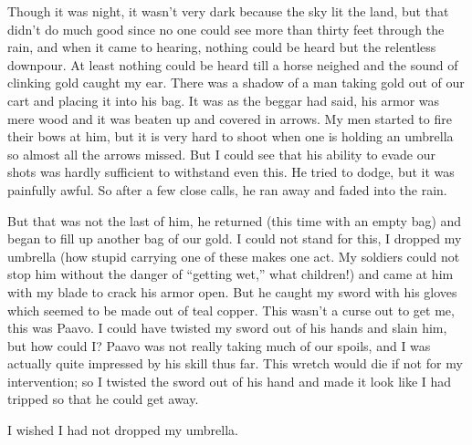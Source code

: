 Though it was night, it wasn't very dark because the sky lit the land, but that didn't do much good since no one could see more than thirty feet through the rain, and when it came to hearing, nothing could be heard but the relentless downpour. At least nothing could be heard till a horse neighed and the sound of clinking gold caught my ear. There was a shadow of a man taking gold out of our cart and placing it into his bag. It was as the beggar had said, his armor was mere wood and it was beaten up and covered in arrows. My men started to fire their bows at him, but it is very hard to shoot when one is holding an umbrella so almost all the arrows missed. But I could see that his ability to evade our shots was hardly sufficient to withstand even this. He tried to dodge, but it was painfully awful. So after a few close calls, he ran away and faded into the rain.

But that was not the last of him, he returned (this time with an empty bag) and began to fill up another bag of our gold. I could not stand for this, I dropped my umbrella (how stupid carrying one of these makes one act. My soldiers could not stop him without the danger of ``getting wet,'' what children!) and came at him with my blade to crack his armor open. But he caught my sword with his gloves which seemed to be made out of teal copper. This wasn't a curse out to get me, this was Paavo. I could have twisted my sword out of his hands and slain him, but how could I? Paavo was not really taking much of our spoils, and I was actually quite impressed by his skill thus far. This wretch would die if not for my intervention; so I twisted the sword out of his hand and made it look like I had tripped so that he could get away.

I wished I had not dropped my umbrella.



